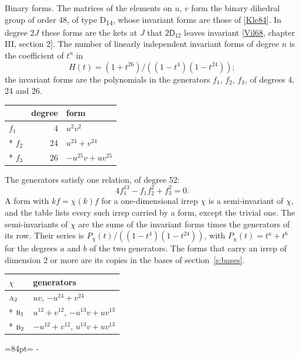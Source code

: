 \documentclass[10pt,a4paper]{article}
\makeatletter
\renewcommand\paragraph{\@startsection{paragraph}{4}{\z@}{1.5ex plus .5ex minus .2ex}{-1em}%
  {\normalfont\small\sffamily\bfseries\color{parttitle}}}
\newcommand{\needspace}[1]{\par\penalty-100\begingroup\dimen0=#1\relax\dimen2=\pagegoal
  \advance\dimen2-\pagetotal\ifdim\dimen0>\dimen2\relax\ifdim\dimen2>0pt\vfil\break\fi\fi
  \endgroup}
\numberwithin{equation}{section}
\newcommand{\grp}[1]{\mathsf{#1}}
\newcommand{\irr}[1]{\text{\normalfont\scshape #1}}
\makeatother
\begin{document}
\paragraph{Binary forms.}
The matrices of the elements on $u$, $v$ form the binary dihedral group of order 48, of type D\textsubscript{14}, whose invariant forms are those of [\href{../../../REFERENCES.pdf\#ref.Kle84}{Kle84}]. In degree $2J$ these forms are the kets at $J$ that $\grp{2D_{12}}$ leaves invariant [\href{../../../REFERENCES.pdf\#ref.Vil68}{Vil68}, chapter III, section 2]. \label{n:head.degree}\label{n:head.form}The number of linearly independent invariant forms of degree $n$ is the coefficient of $t^n$ in
\begin{equation}\label{e:molien}H(t) = (1 + t^{26})/((1-t^{4})(1-t^{24}));\end{equation}
the invariant forms are the polynomials in the generators $f_1$, $f_2$, $f_3$, of degrees 4, 24 and 26.
{\small\begin{longtable}{@{}lrl@{}}\toprule
& degree & form\\\midrule\endhead
\bottomrule\endfoot\endlastfoot
$f_{1}$ & 4 & $u^{2}v^{2}$\\*
$f_{2}$ & 24 & $u^{24} + v^{24}$\\*
$f_{3}$ & 26 & $-u^{25}v + uv^{25}$\\
\bottomrule\end{longtable}}
The generators satisfy one relation, of degree 52:
\begin{equation}\label{e:relation}4f_{1}^{13} - f_{1}f_{2}^{2} + f_{3}^{2} = 0.\end{equation}
A form with $k f = \chi(k) f$ for a one-dimensional irrep $\chi$ is a semi-invariant of $\chi$, and the table lists every such irrep carried by a form, except the trivial one. \label{n:head.generators}The semi-invariants of $\chi$ are the sums of the invariant forms times the generators of its row. Their series is $P_\chi(t)/((1-t^{4})(1-t^{24}))$, with $P_\chi(t) = t^{a} + t^{b}$ for the degrees $a$ and $b$ of the two generators. The forms that carry an irrep of dimension 2 or more are its copies in the bases of section~\ref{s:bases}.
{\small\begin{longtable}{@{}ll@{}}\toprule
$\chi$ & generators\\\midrule\endhead
\bottomrule\endfoot\endlastfoot
$\irr{a}_{2}$ & $uv$, $-u^{24} + v^{24}$\\*
$\irr{b}_{1}$ & $u^{12} + v^{12}$, $-u^{13}v + uv^{13}$\\*
$\irr{b}_{2}$ & $-u^{12} + v^{12}$, $u^{13}v + uv^{13}$\\
\bottomrule\end{longtable}}
\needspace{84pt}
\end{document}
